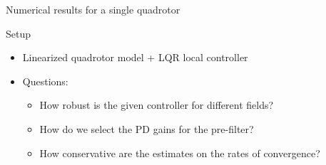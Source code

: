 \documentclass{beamer}
\begin{document}
\begin{frame}{Numerical results for a single quadrotor}
\begin{figure}[ht]
	
\end{figure}
	\begin{block}{Setup}
		\begin{itemize}
			\item Linearized quadrotor model + LQR local controller
			\item Questions:
				  \begin{itemize}
				  	\item How robust is the given controller for different fields?
				  	\item How do we select the PD gains for the pre-filter?
				  	\item How conservative are the estimates on the rates of convergence?
			  	  \end{itemize}
		\end{itemize}
	\end{block}	
\end{frame}
\end{document}
